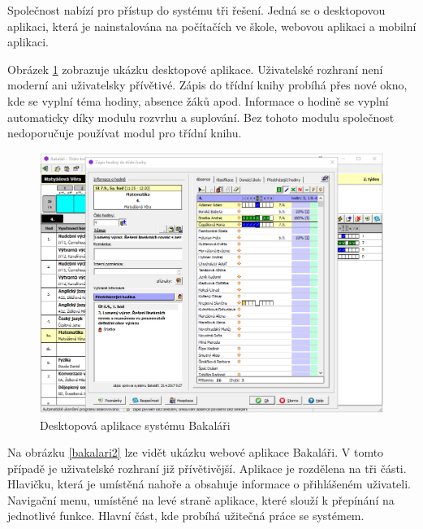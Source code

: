 \noindent Společnost nabízí pro přístup do systému tři řešení. Jedná se o desktopovou aplikaci, která je nainstalována na počítačích ve škole, webovou aplikaci a mobilní aplikaci.

Obrázek \ref{bakalari1} zobrazuje ukázku desktopové aplikace. Uživatelské rozhraní není moderní ani uživatelsky přívětivé. Zápis do třídní knihy probíhá přes nové okno, kde se vyplní téma hodiny, absence žáků apod. Informace o hodině se vyplní automaticky díky modulu rozvrhu a suplování. Bez tohoto modulu společnost nedoporučuje používat modul pro třídní knihu.

\begin{figure}[H]
	\centering
	\includegraphics[width=\textwidth]{images/bakalari1.png}
	\caption{Desktopová aplikace systému Bakaláři \cite{bakalari}}
	\label{bakalari1}
\end{figure}

Na obrázku \ref{bakalari2} lze vidět ukázku webové aplikace Bakaláři. V tomto případě je uživatelské rozhraní již přívětivější. Aplikace je rozdělena na tři části. Hlavičku, která je umístěná nahoře a obsahuje informace o přihlášeném uživateli. Navigační menu, umístěné na levé straně aplikace, které slouží k přepínání na jednotlivé funkce. Hlavní část, kde probíhá užitečná práce se systémem.

